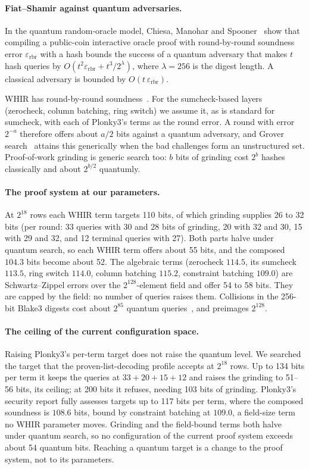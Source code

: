 \documentclass[11pt]{article}
\begin{document}
\paragraph{Fiat--Shamir against quantum adversaries.} In the quantum random-oracle
model, Chiesa, Manohar and
Spooner~\cite{cms19qrom} show that compiling a public-coin interactive oracle
proof with round-by-round soundness error $\varepsilon_{\mathrm{rbr}}$ with a hash
bounds the success of a quantum adversary that makes $t$ hash queries by
$O(t^2\varepsilon_{\mathrm{rbr}}+t^3/2^{\lambda})$, where $\lambda=256$ is the
digest length. A classical adversary is bounded by
$O(t\,\varepsilon_{\mathrm{rbr}})$.

WHIR has round-by-round soundness~\cite[\S5]{whir25}. For the
sumcheck-based layers (zerocheck, column batching, ring switch) we assume it, as
is standard for sumcheck, with each of Plonky3's terms as the round error. A
round with error $2^{-a}$ therefore offers about $a/2$ bits
against a quantum adversary, and Grover search~\cite{grover96} attains this
generically when the bad challenges form an unstructured set. Proof-of-work
grinding is generic search too: $b$ bits of grinding cost $2^{b}$ hashes
classically and about $2^{b/2}$ quantumly.

\paragraph{The proof system at our parameters.} At $2^{18}$ rows each WHIR term
targets 110 bits, of which grinding supplies 26 to 32 bits (per round: 33
queries with 30 and 28 bits of grinding, 20 with 32 and 30, 15 with 29 and 32, and
12 terminal queries with 27). Both parts halve under quantum search, so each WHIR
term offers about 55 bits, and the composed $104.3$ bits become about 52. The
algebraic terms (zerocheck $114.5$, its sumcheck $113.5$, ring switch $114.0$,
column batching $115.2$, constraint batching $109.0$) are Schwartz--Zippel errors
over the $2^{128}$-element field and offer 54 to 58 bits. They are capped by the
field: no number of queries raises them. Collisions in the 256-bit Blake3
digests cost about $2^{85}$ quantum queries~\cite{bht98}, and preimages
$2^{128}$.

\paragraph{The ceiling of the current configuration space.} Raising Plonky3's
per-term target does not raise the quantum level. We searched the target that
the proven-list-decoding profile accepts at $2^{18}$ rows. Up to 134 bits per term
it keeps the queries at $33+20+15+12$ and raises the grinding to 51--56 bits,
its ceiling; at 200 bits it refuses, needing 103 bits of grinding. Plonky3's
security report fully assesses targets up to 117 bits per term, where the
composed soundness is $108.6$ bits, bound by constraint batching at $109.0$, a
field-size term no WHIR parameter moves. Grinding and the field-bound terms both
halve under quantum search, so no configuration of the current proof system
exceeds about 54 quantum bits. Reaching a quantum target is a change to the
proof system, not to its parameters.
\end{document}
